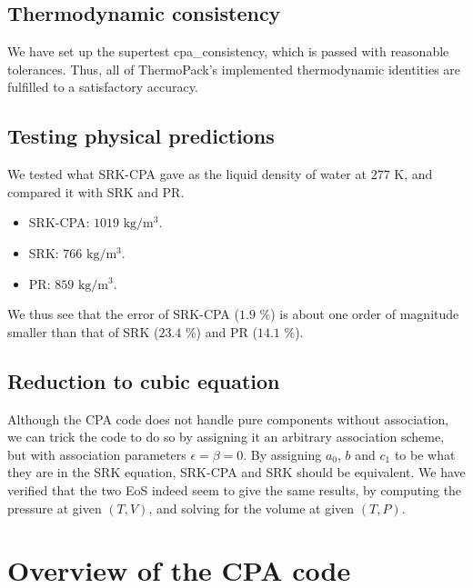 \documentclass[english]{../thermomemo/thermomemo}
\begin{document}
\subsection{Thermodynamic consistency}
We have set up the supertest cpa\_consistency, which is passed with reasonable tolerances. Thus, all of ThermoPack's implemented thermodynamic identities are fulfilled to a satisfactory accuracy.

\subsection{Testing physical predictions}
We tested what SRK-CPA gave as the liquid density of water at $277$ K, and compared it with SRK and PR.
\begin{itemize}
\item SRK-CPA: $1019$ $\mathrm{kg}/\mathrm{m}^3$.
\item SRK: $766$ $\mathrm{kg}/\mathrm{m}^3$.
\item PR: $859$ $\mathrm{kg}/\mathrm{m}^3$.
\end{itemize}
We thus see that the error of SRK-CPA ($1.9$ \%) is about one order of magnitude smaller than that of SRK ($23.4$ \%) and PR ($14.1$ \%).

\subsection{Reduction to cubic equation}
Although the CPA code does not handle pure components without association, we can trick the code to do so by assigning it an arbitrary association scheme, but with association parameters $\epsilon = \beta = 0$. By assigning $a_0$, $b$ and $c_1$ to be what they are in the SRK equation, SRK-CPA and SRK should be equivalent. We have verified that the two EoS indeed seem to give the same results, by computing the pressure at given $(T,V)$, and solving for the volume at given $(T,P)$.

\section{Overview of the CPA code}
\end{document}
